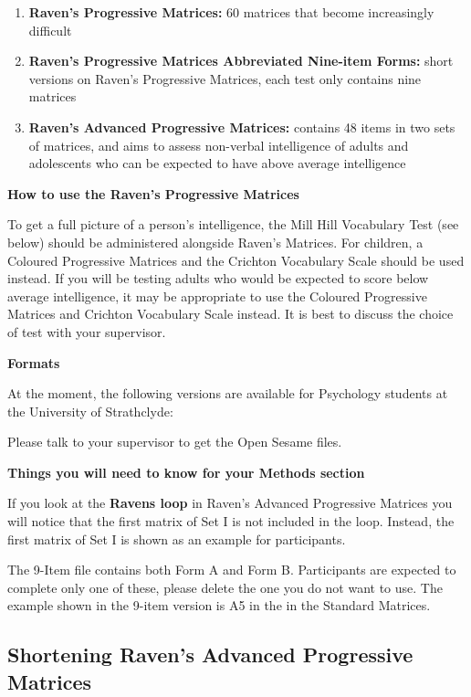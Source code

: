 \documentclass[
]{book}
\providecommand{\tightlist}{%
  \setlength{\itemsep}{0pt}\setlength{\parskip}{0pt}}
\begin{document}
\begin{enumerate}
\def\labelenumi{\arabic{enumi}.}
\tightlist
\item
  \textbf{Raven's Progressive Matrices:} 60 matrices that become increasingly difficult
\item
  \textbf{Raven's Progressive Matrices Abbreviated Nine-item Forms:} short versions on Raven's Progressive Matrices, each test only contains nine matrices
\item
  \textbf{Raven's Advanced Progressive Matrices:} contains 48 items in two sets of matrices, and aims to assess non-verbal intelligence of adults and adolescents who can be expected to have above average intelligence
\end{enumerate}

\textbf{How to use the Raven's Progressive Matrices}

To get a full picture of a person's intelligence, the Mill Hill Vocabulary Test (see below) should be administered alongside Raven's Matrices. For children, a Coloured Progressive Matrices and the Crichton Vocabulary Scale should be used instead. If you will be testing adults who would be expected to score below average intelligence, it may be appropriate to use the Coloured Progressive Matrices and Crichton Vocabulary Scale instead. It is best to discuss the choice of test with your supervisor.

\textbf{Formats}

At the moment, the following versions are available for Psychology students at the University of Strathclyde:

Please talk to your supervisor to get the Open Sesame files.

\textbf{Things you will need to know for your Methods section}

If you look at the \textbf{Ravens loop} in Raven's Advanced Progressive Matrices you will notice that the first matrix of Set I is not included in the loop. Instead, the first matrix of Set I is shown as an example for participants.

The 9-Item file contains both Form A and Form B. Participants are expected to complete only one of these, please delete the one you do not want to use. The example shown in the 9-item version is A5 in the in the Standard Matrices.

\hypertarget{shortening-ravens-advanced-progressive-matrices}{%
\subsection{Shortening Raven's Advanced Progressive Matrices}\label{shortening-ravens-advanced-progressive-matrices}}
\end{document}
